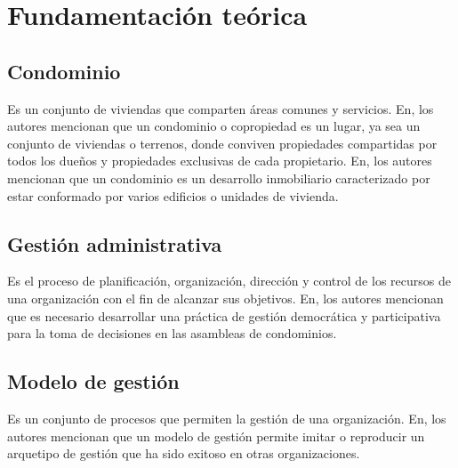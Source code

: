 \section{Fundamentación teórica}\label{subsec:fundamentacion-teorica}

\subsection{Condominio}\label{subsec:condominio}
Es un conjunto de viviendas que comparten áreas comunes y servicios. En\cite{montalvoDesarrolloSistemaSoftware2023, ortegaAnalisisDisenoImplementacion2017, pintoSistemaGestionAdministrativo2017,moreiraDESARROLLOSISTEMAWEB2019}, los autores mencionan que un condominio o copropiedad es un lugar, ya sea un conjunto de viviendas o terrenos, donde conviven propiedades compartidas por todos los dueños y propiedades exclusivas de cada propietario. En\cite{bravoSISTEMAINFORMACIONWEB2015}, los autores mencionan que un condominio es un desarrollo inmobiliario caracterizado por estar conformado por varios edificios o unidades de vivienda.

\subsection{Gestión administrativa}\label{subsec:gestion-administrativa}
Es el proceso de planificación, organización, dirección y control de los recursos de una organización con el fin de alcanzar sus objetivos. En\cite{montalvoDesarrolloSistemaSoftware2023, portugalSistemaInformacionPara2022, moscayzaSistemaWebPara}, los autores mencionan que es necesario desarrollar una práctica de gestión democrática y participativa para la toma de decisiones en las asambleas de condominios.

\subsection{Modelo de gestión}\label{subsec:modelo-de-gestion}
Es un conjunto de procesos que permiten la gestión de una organización. En\cite{montalvoDesarrolloSistemaSoftware2023, moscayzaSistemaWebPara, nietoPrototipoAplicacionWeb2018}, los autores mencionan que un modelo de gestión permite imitar o reproducir un arquetipo de gestión que ha sido exitoso en otras organizaciones.

